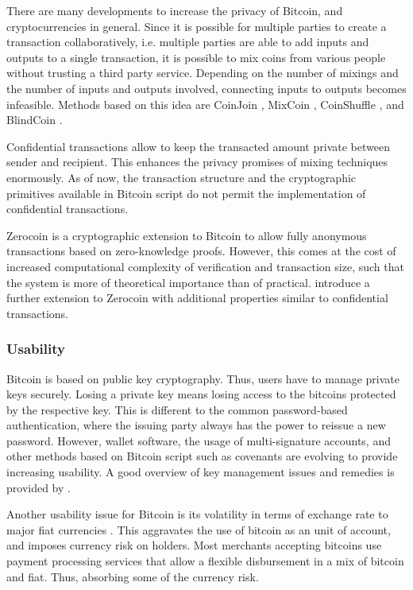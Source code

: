 There are many developments to increase the privacy of Bitcoin, and cryptocurrencies in general. Since it is possible for multiple parties to create a transaction collaboratively, i.e. multiple parties are able to add inputs and outputs to a single transaction, it is possible to mix coins from various people without trusting a third party service. Depending on the number of mixings and the number of inputs and outputs involved, connecting inputs to outputs becomes infeasible. Methods based on this idea are CoinJoin \parencite{maxwellcoinjoin,Meiklejohn2015}, MixCoin \parencite{Bonneau2014}, CoinShuffle \parencite{Ruffing2014}, and BlindCoin \parencite{Valenta2015}. 

Confidential transactions \parencite{nullc2015} allow to keep the transacted amount private between sender and recipient. This enhances the privacy promises of mixing techniques enormously. As of now, the transaction structure and the cryptographic primitives available in Bitcoin script do not permit the implementation of confidential transactions.

Zerocoin \parencite{6547123} is a cryptographic extension to Bitcoin to allow fully anonymous transactions based on zero-knowledge proofs. However, this comes at the cost of increased computational complexity of verification and transaction size, such that the system is more of theoretical importance than of practical. \cite{Androulaki2014} introduce a further extension to Zerocoin with additional properties similar to confidential transactions.

\subsubsection{Usability}

Bitcoin is based on public key cryptography. Thus, users have to manage private keys securely. Losing a private key means losing access to the bitcoins protected by the respective key. This is different to the common password-based authentication, where the issuing party always has the power to reissue a new password. 
However, wallet software, the usage of multi-signature accounts, and other methods based on Bitcoin script such as covenants \parencite{moserbitcoin} are evolving to provide increasing usability. 
A good overview of key management issues and remedies is provided by \cite{eskandari2015first}.

Another usability issue for Bitcoin is its volatility in terms of exchange rate to major fiat currencies \parencite{Luther2014,Sapuric2014}. This aggravates the use of bitcoin as an unit of account, and imposes currency risk on holders. Most merchants accepting bitcoins use payment processing services that allow a flexible disbursement in a mix of bitcoin and fiat. Thus, absorbing some of the currency risk.

